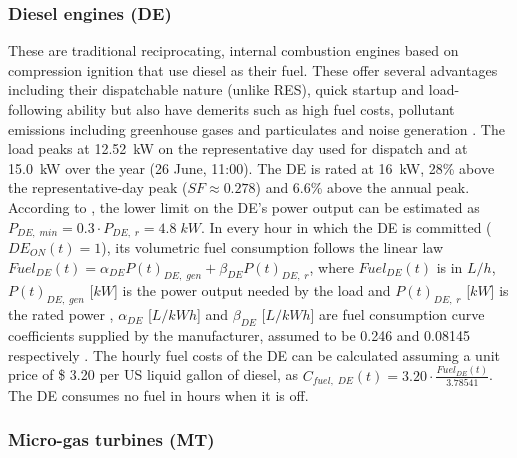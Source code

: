 \documentclass[final,3p,times]{elsarticle}
\begin{document}
\subsubsection{Diesel engines (DE)}

These are traditional reciprocating, internal combustion engines based on compression ignition that use diesel as their fuel. These offer several advantages including their dispatchable nature (unlike RES), quick startup and load-following ability but also have demerits such as high fuel costs, pollutant emissions including greenhouse gases and particulates and noise generation \cite{mg_review}. The load peaks at 12.52~kW on the representative day used for dispatch and at 15.0~kW over the year (26 June, 11:00). The DE is rated at 16~kW, 28\% above the representative-day peak ($SF \approx 0.278$) and 6.6\% above the annual peak. According to \cite{fathima2015}, the lower limit on the DE's power output can be estimated as $P_{DE,\;min} = 0.3 \cdot P_{DE,\; r} = 4.8 \; kW$. In every hour in which the DE is committed ($DE_{ON}(t) = 1$), its volumetric fuel consumption follows the linear law $Fuel_{DE}(t) = \alpha_{DE} P(t)_{DE,\;gen} + \beta_{DE} P(t)_{DE,\;r}$, where $Fuel_{DE}(t)$ is in $L/h$, $P(t)_{DE,\;gen}$ [$kW$] is the power output needed by the load and $P(t)_{DE,\;r}$ [$kW$] is the rated power \cite{kaabeche2014}, $\alpha_{DE}$ [$L/kWh$] and $\beta_{DE}$ [$L/kWh$] are fuel consumption curve coefficients supplied by the manufacturer, assumed to be 0.246 and 0.08145 respectively \cite{kaabeche2014}. The hourly fuel costs of the DE can be calculated assuming a unit price of \$ 3.20 per US liquid gallon of diesel, as $C_{fuel,\; DE}(t) = 3.20 \cdot \frac{Fuel_{DE}(t)}{3.78541}$. The DE consumes no fuel in hours when it is off.

\subsubsection{Micro-gas turbines (MT)}
\end{document}
